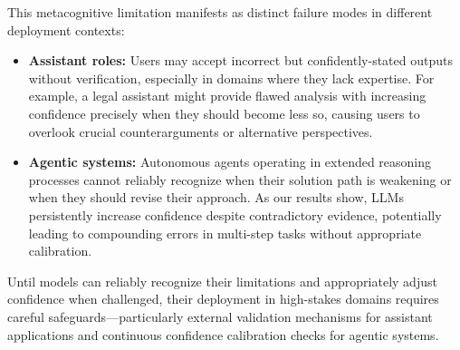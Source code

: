 \documentclass{article}
\begin{document}
This metacognitive limitation manifests as distinct failure modes in different deployment contexts:
\begin{itemize}
    \item \textbf{Assistant roles:} Users may accept incorrect but confidently-stated outputs without verification, especially in domains where they lack expertise. For example, a legal assistant might provide flawed analysis with increasing confidence precisely when they should become less so, causing users to overlook crucial counterarguments or alternative perspectives.
    \item \textbf{Agentic systems:} Autonomous agents operating in extended reasoning processes cannot reliably recognize when their solution path is weakening or when they should revise their approach. As our results show, LLMs persistently increase confidence despite contradictory evidence, potentially leading to compounding errors in multi-step tasks without appropriate calibration.
\end{itemize}

Until models can reliably recognize their limitations and appropriately adjust confidence when challenged, their deployment in high-stakes domains requires careful safeguards—particularly external validation mechanisms for assistant applications and continuous confidence calibration checks for agentic systems.


\end{document}
